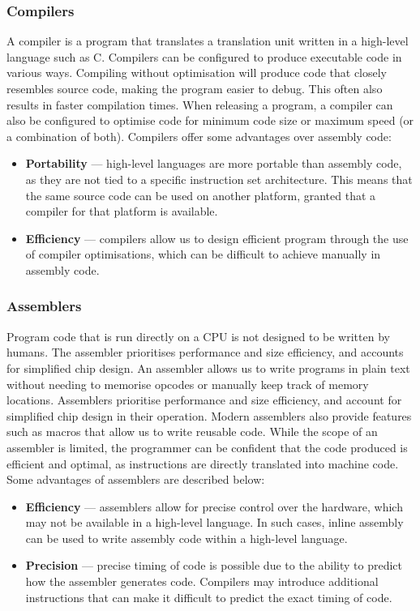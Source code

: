 \documentclass{article}
\begin{document}
\subsubsection{Compilers}
A compiler is a program that translates a translation unit written in a
high-level language such as C. Compilers can be configured to produce
executable code in various ways. Compiling without optimisation will
produce code that closely resembles source code, making the program
easier to debug. This often also results in faster compilation times.
When releasing a program, a compiler can also be configured to optimise
code for minimum code size or maximum speed (or a combination of both).
Compilers offer some advantages over assembly code:
\begin{itemize}
    \item \textbf{Portability} --- high-level languages are more
          portable than assembly code, as they are not tied to a specific
          instruction set architecture. This means that the same source code
          can be used on another platform, granted that a compiler for that
          platform is available.
    \item \textbf{Efficiency} --- compilers allow us to design efficient
          program through the use of compiler optimisations, which can be
          difficult to achieve manually in assembly code.
\end{itemize}
\subsubsection{Assemblers}
Program code that is run directly on a CPU is not designed to be
written by humans. The assembler prioritises performance and size
efficiency, and accounts for simplified chip design. An assembler
allows us to write programs in plain text without needing to memorise
opcodes or manually keep track of memory locations. Assemblers
prioritise performance and size efficiency, and account for simplified
chip design in their operation. Modern assemblers also provide features
such as macros that allow us to write reusable code. While the scope of
an assembler is limited, the programmer can be confident that the code
produced is efficient and optimal, as instructions are directly
translated into machine code.
Some advantages of assemblers are described below:
\begin{itemize}
    \item \textbf{Efficiency} --- assemblers allow for precise control
          over the hardware, which may not be available in a high-level
          language. In such cases, inline assembly can be used to write
          assembly code within a high-level language.
    \item \textbf{Precision} --- precise timing of code is possible due to
          the ability to predict how the assembler generates code. Compilers
          may introduce additional instructions that can make it difficult to
          predict the exact timing of code.
\end{itemize}
\end{document}

